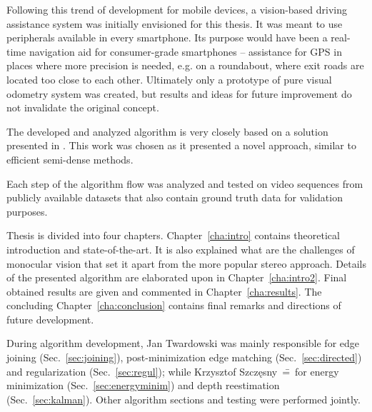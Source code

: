 Following this trend of development for mobile devices, a vision-based driving assistance system was initially envisioned for this thesis. It was meant to use peripherals available in every smartphone. Its purpose would have been a real-time navigation aid for consumer-grade smartphones -- assistance for GPS in places where more precision is needed, e.g. on a roundabout, where exit roads are located too close to each other. Ultimately only a prototype of pure visual odometry system was created, but results and ideas for future improvement do not invalidate the original concept.

The developed and analyzed algorithm is very closely based on a solution presented in \cite{jose2015realtime}. This work was chosen as it presented a novel approach, similar to efficient semi-dense methods.

Each step of the algorithm flow was analyzed and tested on video sequences from publicly available datasets that also contain ground truth data for validation purposes.

Thesis is divided into four chapters. Chapter~\ref{cha:intro} contains theoretical introduction and state-of-the-art. It is also explained what are the challenges of monocular vision that set it apart from the more popular stereo approach. Details of the presented algorithm are elaborated upon in Chapter~\ref{cha:intro2}. Final obtained results are given and commented in Chapter~\ref{cha:results}. The concluding Chapter~\ref{cha:conclusion} contains final remarks and directions of future development.

During algorithm development, Jan Twardowski was mainly responsible for edge joining (Sec.~\ref{sec:joining}), post-minimization edge matching (Sec.~\ref{sec:directed}) and regularization (Sec.~\ref{sec:regul}); while Krzysztof Szcz\k{e}sny~\==~for energy minimization (Sec.~\ref{sec:energyminim}) and depth reestimation (Sec.~\ref{sec:kalman}). Other algorithm sections and testing were performed jointly. 








